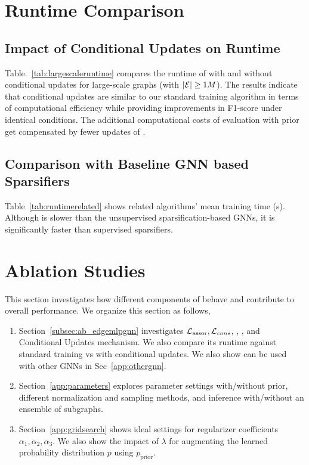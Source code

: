 \section{Runtime Comparison}
\label{app:runtime}

\subsection{Impact of Conditional Updates on Runtime}
Table.~\ref{tab:largescaleruntime} compares the runtime of \sgs with and without conditional updates for large-scale graphs (with $|{\mathcal{E}}| \ge 1M$). The results indicate that conditional updates are similar to our standard training algorithm in terms of computational efficiency while providing improvements in F1-score under identical conditions. The additional computational costs of evaluation with prior get compensated by fewer updates of \edgemlp.



\subsection{Comparison with Baseline GNN based Sparsifiers}
\label{app:runtimerelated}
Table~\ref{tab:runtimerelated} shows related algorithms' mean training time (s). Although \sgs is slower than the unsupervised sparsification-based GNNs, it is significantly faster than supervised sparsifiers.



\section{Ablation Studies}
\label{app:ablationstudy}

This section investigates how different components of \sgs behave and contribute to overall performance. We organize this section as follows,

\begin{enumerate}
    \item Section~\ref{subsec:ab_edgemlpgnn} investigates ${\mathcal{L}}_\mathrm{assor}, {\mathcal{L}}_{cons}$, \edgemlp, \gnn, and Conditional Updates mechanism. We also compare its runtime against standard \sgs training vs \sgs with conditional updates. We also show \sgs can be used with other GNNs in Sec~\ref{app:othergnn}.

    \item Section~\ref{app:parameters} explores parameter settings with/without prior, different normalization and sampling methods, and inference with/without an ensemble of subgraphs.

    \item Section~\ref{app:gridsearch} shows ideal settings for regularizer coefficients $\alpha_1, \alpha_2, \alpha_3$. We also show the impact of $\lambda$ for augmenting the learned probability distribution $p$ using $p_\mathrm{prior}$.
\end{enumerate}


